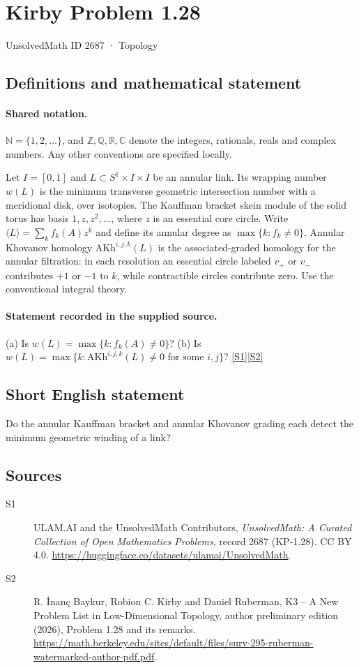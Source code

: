 \documentclass[11pt]{article}
\newcommand{\sref}[2]{\hyperlink{source:#1:#2}{[S#2]}}
\begin{document}
\setcounter{section}{2686}
\section{Kirby Problem 1.28}\label{2687}
{\small\sffamily UnsolvedMath ID 2687 · Topology}
\subsection{Definitions and mathematical statement}

\paragraph{Shared notation.}$\mathbb N=\{1,2,\ldots\}$, and $\mathbb Z,\mathbb Q,\mathbb R,\mathbb C$ denote the integers, rationals, reals and complex numbers. Any other conventions are specified locally.


Let $I=[0,1]$ and $L\subset S^1\times I\times I$ be an annular link. Its wrapping number $w(L)$ is the minimum transverse geometric intersection number with a meridional disk, over isotopies. The Kauffman bracket skein module of the solid torus has basis $1,z,z^2,\ldots$, where $z$ is an essential core circle. Write $\langle L\rangle=\sum_k f_k(A)z^k$ and define its annular degree as $\max\{k:f_k\ne0\}$. Annular Khovanov homology $\mathrm{AKh}^{i,j,k}(L)$ is the associated-graded homology for the annular filtration: in each resolution an essential circle labeled $v_+$ or $v_-$ contributes $+1$ or $-1$ to $k$, while contractible circles contribute zero. Use the conventional integral theory.
\paragraph{Statement recorded in the supplied source.}
(a) Is $w(L)=\max\{k:f_k(A)\ne0\}$? (b) Is $w(L)=\max\{k:\mathrm{AKh}^{i,j,k}(L)\ne0\text{ for some }i,j\}$? \sref{2687}{1}\sref{2687}{2}
\subsection{Short English statement}
Do the annular Kauffman bracket and annular Khovanov grading each detect the minimum geometric winding of a link?
\subsection{Sources}
\begin{description}
\item[\hypertarget{source:2687:1}{S1}] ULAM.AI and the UnsolvedMath Contributors, \emph{UnsolvedMath: A Curated Collection of Open Mathematics Problems}, record 2687 (KP-1.28). CC BY 4.0. \url{https://huggingface.co/datasets/ulamai/UnsolvedMath}.
\item[\hypertarget{source:2687:2}{S2}] R. \.{I}nan\c{c} Baykur, Robion C. Kirby and Daniel Ruberman, K3 -- A New Problem List in Low-Dimensional Topology, author preliminary edition (2026), Problem 1.28 and its remarks. \url{https://math.berkeley.edu/sites/default/files/surv-295-ruberman-watermarked-author-pdf.pdf}.
\end{description}
\label{end:2687}
\end{document}
